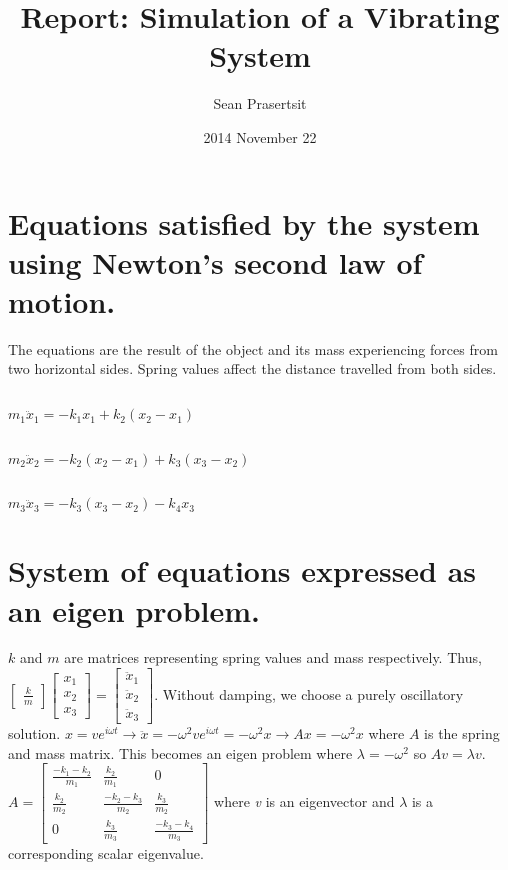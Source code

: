 \documentclass{article}
\begin{document}
\title{Report: Simulation of a Vibrating System}
\author{Sean Prasertsit}
\date{2014 November 22}
\maketitle

\section{Equations satisfied by the system using Newton's second law of motion.}
The equations are the result of the object and its mass experiencing forces from two horizontal sides. Spring values affect the distance travelled from both sides.
\subsection{}	\(m_1\ddot{x}_1 = -k_1x_1 + k_2(x_2 - x_1)\)
\subsection{}	\(m_2\ddot{x}_2 = -k_2(x_2 - x_1) + k_3(x_3 - x_2)\)
\subsection{}	\(m_3\ddot{x}_3 = -k_3(x_3 - x_2) - k_4x_3\)

\section{System of equations expressed as an eigen problem.}
\(k\) and \(m\) are matrices representing spring values and mass respectively. Thus, \newline
\(
	\begin{bmatrix}
	\frac{k}{m}
	\end{bmatrix}
	\begin{bmatrix}
	x_1 \\
	x_2 \\
	x_3
	\end{bmatrix}
	=
	\begin{bmatrix}
	\ddot{x}_1 \\
	\ddot{x}_2 \\
	\ddot{x}_3
	\end{bmatrix}\). \newline
Without damping, we choose a purely oscillatory solution. \newline
\(x = ve^{i\omega t} \longrightarrow \ddot{x} = -\omega^2ve^{i\omega t} = -\omega^2x \longrightarrow Ax = -\omega^2x\) where \(A\) is the spring and mass matrix. This becomes an eigen problem where \(\lambda = -\omega^2\) so
\(Av = \lambda v\). \newline \newline
\(A = 
	\begin{bmatrix}
	\frac{-k_1 - k_2}{m_1} 	& \frac{k_2}{m_1} 		& 0 \\
	\frac{k_2}{m_2} 		& \frac{-k_2 - k_3}{m_2} & \frac{k_3}{m_2} \\
	0						& \frac{k_3}{m_3}		& \frac{-k_3 - k_4}{m_3}
	\end{bmatrix} \)
where \textit{v} is an eigenvector and \(\lambda \) is a corresponding scalar eigenvalue.
\end{document}
